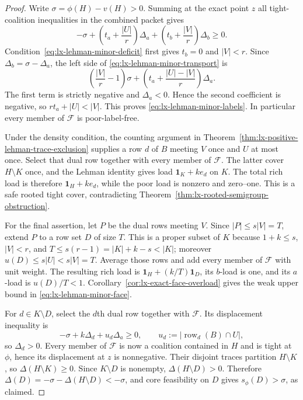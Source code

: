 \begin{proof}
Write $\sigma=\phi(H)-v(H)>0$.  Summing at the exact point $z$ all
tight-coalition inequalities in the combined packet gives
\[
 -\sigma+
 \left(t_a+\frac{|U|}{r}\right)\Delta_a+
 \left(t_b+\frac{|V|}{r}\right)\Delta_b\geq0.      \tag{LM-4}
 \label{eq:lx-lehman-minor-transport}
\]
Condition~\eqref{eq:lx-lehman-minor-deficit} first gives $t_b=0$ and
$|V|<r$.  Since $\Delta_b=\sigma-\Delta_a$, the left side of
\eqref{eq:lx-lehman-minor-transport} is
\[
 \left(\frac{|V|}{r}-1\right)\sigma+
 \left(t_a+\frac{|U|-|V|}{r}\right)\Delta_a.
\]
The first term is strictly negative and $\Delta_a<0$.  Hence the second
coefficient is negative, so $rt_a+|U|<|V|$.  This proves
\eqref{eq:lx-lehman-minor-labels}.  In particular every member of
$\mathcal F$ is poor-label-free.

Under the density condition, the counting argument in
Theorem~\ref{thm:lx-positive-lehman-trace-exclusion} supplies a row $d$ of
$B$ meeting $V$ once and $U$ at most once.  Select that dual row together
with every member of $\mathcal F$.  The latter cover $H\setminus K$ once,
and the Lehman identity gives load $\mathbf1_K+k e_d$ on $K$.  The total
rich load is therefore $\mathbf1_H+k e_d$, while the poor load is nonzero
and zero--one.  This is a safe rooted tight cover, contradicting
Theorem~\ref{thm:lx-rooted-semigroup-obstruction}.

For the final assertion, let $P$ be the dual rows meeting $V$.  Since
$|P|\leq s|V|=T$, extend $P$ to a row set $D$ of size $T$.  This is a
proper subset of $K$ because $1+k\leq s$, $|V|<r$, and
$T\leq s(r-1)=|K|+k-s<|K|$; moreover
$u(D)\leq s|U|<s|V|=T$.  Average those rows
and add every member of $\mathcal F$ with unit weight.  The resulting rich
load is $\mathbf1_H+(k/T)\mathbf1_D$, its $b$-load is one, and its $a$-load
is $u(D)/T<1$.  Corollary~\ref{cor:lx-exact-face-overload} gives the weak
upper bound in \eqref{eq:lx-lehman-minor-face}.

For $d\in K\setminus D$, select the $d$th dual row together with
$\mathcal F$.  Its displacement inequality is
\[
 -\sigma+k\Delta_d+u_d\Delta_a\geq0,
 \qquad u_d:=|\operatorname{row}_d(B)\cap U|,
\]
so $\Delta_d>0$.  Every member of $\mathcal F$ is now a coalition contained
in $H$ and is tight at $\phi$, hence its displacement at $z$ is
nonnegative.  Their disjoint traces partition $H\setminus K$, so
$\Delta(H\setminus K)\geq0$.  Since $K\setminus D$ is nonempty,
$\Delta(H\setminus D)>0$.  Therefore
$\Delta(D)=-\sigma-\Delta(H\setminus D)<-\sigma$, and core feasibility on
$D$ gives $s_\phi(D)>\sigma$, as claimed.
\end{proof}

